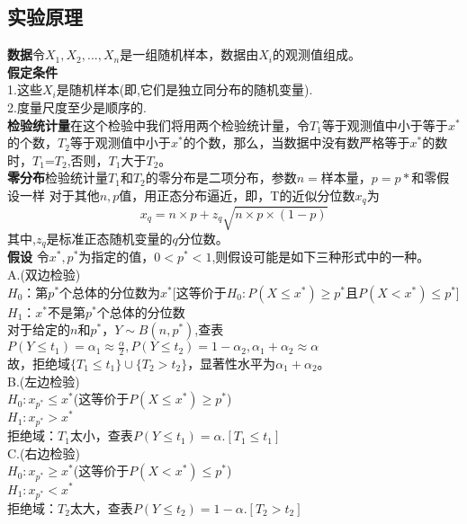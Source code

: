 \documentclass[a4paper, 11pt]{article}
\begin{document}
	\subsection{实验原理}
	\noindent\textbf{数据}\quad 令$X_{1},X_{2},...,X_{n}$是一组随机样本，数据由$X_{i}$的观测值组成。\\
	\textbf{假定条件}\\
	\indent1.这些$X_{i}$是随机样本(即,它们是独立同分布的随机变量).\\
	\indent2.度量尺度至少是顺序的.\\
	\textbf{检验统计量}\quad 在这个检验中我们将用两个检验统计量，令$T_{1}$等于观测值中小于等于$x^{*}$的个数，$T_{2}$等于观测值中小于$x^{*}$的个数，那么，当数据中没有数严格等于$x^{*}$的数时，$T_{1}$=$T_{2}$,否则，$T_{1}$大于$T_{2}$。\\
	\textbf{零分布}\quad 检验统计量$T_{1}$和$T_{2}$的零分布是二项分布，参数$ n= $样本量，$ p=p* $和零假设一样
	对于其他$ n,p $值，用正态分布逼近，即，T的近似分位数$ x_{q} $为
	$$ x_{q}=n\times p+z_{q}\sqrt{n\times p\times (1-p)}$$
	其中,$z_{q}$是标准正态随机变量的$ q $分位数。
	\\\textbf{假设} \quad 令$ x^{*},p^{*} $为指定的值，$ 0<p^{*}<1 $,则假设可能是如下三种形式中的一种。
	\\A.(双边检验)
	\\$ H_{0} $：第$ p^{*} $个总体的分位数为$ x^{*} $[这等价于$H_{0}: P(X\leq x^{*})\geq p^{*} $且$ P(X<x^{*}) \leq p^{*} $]
	\\$ H_{1} $：$ x^{*} $不是第$ p^{*} $个总体的分位数
	\\对于给定的$ n $和$ p^{*} $，$ Y \sim B(n,p^{*}) $,查表$P(Y\leq t_{1})=\alpha_{1}\approx\frac{\alpha}{2},P(Y\leq t_{2})=1-\alpha_{2},\alpha_{1}+\alpha_{2}\approx\alpha$
	\\故，拒绝域$\{T_{1}\leq t_{1}\}\cup\{T_{2}> t_{2}\}$，显著性水平为$\alpha_{1}+\alpha_{2}$。
	\\B.(左边检验)
	\\$ H_{0}:x_{p^{*}}\leq x^{*}$(这等价于$P(X\leq x^{*})\geq p^{*}$)
	\\$ H_{1}:x_{p^{*}}> x^{*}$
	\\拒绝域：$T_{1}$太小，查表$P(Y\leq t_{1})=\alpha$.$[T_{1}\leq t_{1}]$
	\\C.(右边检验)
	\\$ H_{0}:x_{p^{*}}\geq x^{*}$(这等价于$P(X< x^{*})\leq p^{*}$)
	\\$ H_{1}:x_{p^{*}}< x^{*}$
	\\拒绝域：$T_{2}$太大，查表$P(Y\leq t_{2})=1-\alpha$.$[T_{2}> t_{2}]$
	\newpage
\end{document}
